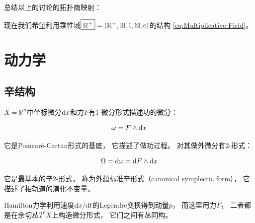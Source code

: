 ﻿\documentclass[10pt,a4paper]{article}
\newcommand{\sqplus}{\mathbin{\boxplus}}
\newcommand{\sqtimes}{\mathbin{\boxtimes}}
\begin{document}
总结以上的讨论的拓扑商映射：


现在我们希望利用乘性域$\boxed{\mathbb R^+} = (\mathbb R^+,\sqplus,1,\sqtimes,\text e)$的结构
\eqref{eq:Multiplicative-Field}。


\section{动力学}

\subsection{辛结构}

$X = \mathbb R^n$中坐标微分$\text dx$和力$F$有$1$-微分形式描述功的微分：

\begin{equation}
\omega = F \wedge \text dx
\label{eq:power-1-form}
\end{equation}

它是Poincaré-Cartan形式的基底，
它描述了做功过程。
对其做外微分有$2$-形式：

\begin{equation}
\Omega = \text d \omega = \text d F \wedge \text dx
\label{eq:canonical-symplectic-2-form}
\end{equation}

它是最基本的辛$2$-形式，
称为外蕴标准辛形式（canonical symplectic form），
它描述了相轨道的演化不变量。

Hamilton力学利用速度$\text dx / \text dt$的Legendre变换得到动量$p$，
而这里用力$F$，
二者都是在余切丛$T^*X$上构造微分形式，
它们之间有丛同构。
\end{document}
